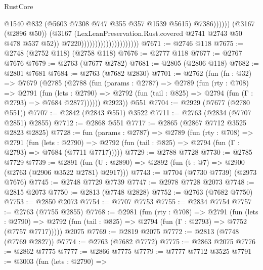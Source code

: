 \begin{lexlean}{RustCore}
\begin{coremodule}
                                                          @1540
                                                          @832
                                                          (@5603 @7308 @747 @355 @357 @1539 @5615)
                                                          @7386))))))
                                              (@3167 (@2896 @50))
                                              (@3167
                                                (LexLeanPreservation.Rust.covered
                                                  @2741
                                                  @2743
                                                  @50
                                                  @478
                                                  @537
                                                  @52))
                                              @7220)))))))))))))))))))))
@7671 := @2746 @118
@7675 := @2748 (@2752 @118) (@2758 @118)
@7676 := @2777 @118
@7677 := @2767 @7676
@7679 := @2763 (@7677 @2782)
@7681 := @2805 (@2806 @118)
@7682 := @2801 @7681
@7684 := @2763 (@7682 @2830)
@7701 := @2762
    (fun (fn : @32) =>
    @7679
      (@2785
        (@2788
          (fun (params : @2787) =>
          @2789
            (fun (rty : @708) =>
            @2791
              (fun (lets : @2790) =>
              @2792 (fun (tail : @825) => @2794 (fun (Γ : @2793) => @7684 @2877))))))
        @2923))
    @551
@7704 := @2929 (@7677 (@2780 @551))
@7707 := @2842 (@2843 @551) @3522
@7711 := @2763 (@2834 (@7707 @2851) @2855)
@7712 := @2868 @551
@7717 := @2865 (@2867 @7712 @3525 @2823 @2825)
@7728 := fun (params : @2787) =>
  @2789
    (fun (rty : @708) =>
    @2791
      (fun (lets : @2790) =>
      @2792 (fun (tail : @825) => @2794 (fun (Γ : @2793) => @7684 (@7711 @7717)))))
@7729 := @2788 @7728
@7730 := @2785 @7729
@7739 := @2891 (fun (U : @2890) => @2892 (fun (t : @7) => @2900 (@2763 (@2906 @3522 @2781) @2917)))
@7743 := @7704 (@7730 @7739) (@2973 @7676)
@7745 := @2748 @7729 @7739
@7747 := @2978 @7728 @2073
@7748 := @2815 @2073
@7750 := @2813 (@7748 @2828)
@7752 := @2763 (@7682 @7750)
@7753 := @2850 @2073
@7754 := @7707 @7753
@7755 := @2834 @7754
@7757 := @2763 (@7755 @2855)
@7768 := @2981
    (fun (rty : @708) =>
    @2791
      (fun (lets : @2790) =>
      @2792 (fun (tail : @825) => @2794 (fun (Γ : @2793) => @7752 (@7757 @7717)))))
    @2075
@7769 := @2819 @2075
@7772 := @2813 (@7748 (@7769 @2827))
@7774 := @2763 (@7682 @7772)
@7775 := @2863 @2075
@7776 := @2862 @7775
@7777 := @2866 @7775
@7779 := @7777 @7712 @3525
@7791 := @3003
    (fun (lets : @2790) =>

\end{coremodule}
\end{lexlean}
